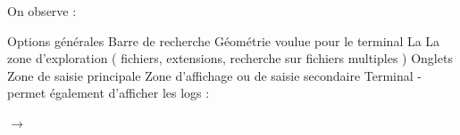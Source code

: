 \begin{Exemple}
\begin{center}
    \end{center}

    On observe : 
    \begin{tcbenumerate}[2]
        \tcbitem Options générales
        \tcbitem Barre de recherche
        \tcbitem Géométrie voulue pour le terminal
        \tcbitem La 
        \tcbitem La zone d'exploration ( fichiers, extensions, recherche sur fichiers multiples )
        \tcbitem Onglets
        \tcbitem Zone de saisie principale
        \tcbitem Zone d'affichage ou de saisie secondaire
        \tcbitem Terminal - permet également d'afficher les logs : 

        $\rightarrow$
    \end{tcbenumerate}
\end{Exemple}